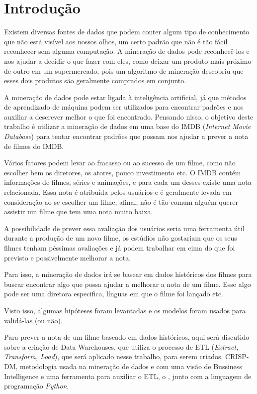 \section{Introdução}

Existem diversas fontes de dados que podem conter algum tipo de conhecimento que não está visível aos nossos olhos, um certo padrão que não é tão fácil reconhecer sem alguma computação. A mineração de dados pode reconhecê-los e nos ajudar a decidir o que fazer com eles, como deixar um produto mais próximo de outro em um supermercado, pois um algoritmo de mineração descobriu que esses dois produtos são geralmente comprados em conjunto.

A mineração de dados pode estar ligada à inteligência artificial, já que métodos de aprendizado de máquina podem ser utilizados para encontrar padrões e nos auxiliar a descrever melhor o que foi encontrado.
Pensando nisso, o objetivo deste trabalho é utilizar a mineração de dados em uma base do IMDB (\textit{Internet Movie Database}) para tentar encontrar padrões que possam nos ajudar a prever a nota de filmes do IMDB.

Vários fatores podem levar ao fracasso ou ao sucesso de um filme, como não escolher bem os diretores, os atores, pouco investimento etc. O IMDB contém informações de filmes, séries e animações, e para cada um desses existe uma nota relacionada. Essa nota é atribuída pelos usuários e é geralmente levada em consideração ao se escolher um filme, afinal, não é tão comum alguém querer assistir um filme que tem uma nota muito baixa.

A possibilidade de prever essa avaliação dos usuários seria uma ferramenta útil durante a produção de um novo filme, os estúdios não gostariam que os seus filmes tenham péssimas avaliações e já podem trabalhar em cima do que foi previsto e possivelmente melhorar a nota.

Para isso, a mineração de dados irá se basear em dados históricos dos filmes para buscar encontrar algo que possa ajudar a melhorar a nota de um filme. Esse algo pode ser uma diretora especifica, línguas em que o filme foi lançado etc.

Visto isso, algumas hipóteses foram levantadas e os modelos foram usados para validá-las (ou não).

Para prever a nota de um filme baseado em dados históricos, aqui será discutido sobre a criação de Data Warehouses, que utiliza o processo de ETL (\textit{Extract, Transform, Load}), que será aplicado nesse trabalho, para serem criados. CRISP-DM, metodologia usada na mineração de dados e com uma visão de Bussiness Intelligence e uma ferramenta para auxiliar o ETL, o \pdi, junto com a linguagem de programação \textit{Python}.

